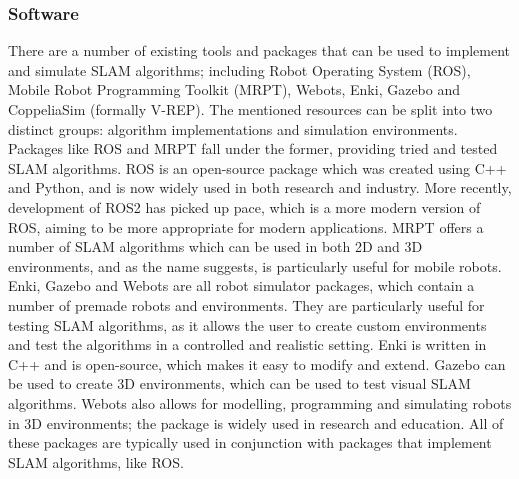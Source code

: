 \documentclass[12pt]{article}
\begin{document}
\subsubsection{Software}
There are a number of existing tools and packages that can be used to implement and simulate SLAM algorithms; including Robot Operating System (ROS),
Mobile Robot Programming Toolkit (MRPT), Webots, Enki, Gazebo and CoppeliaSim (formally V-REP). The mentioned resources can be split into
two distinct groups: algorithm implementations and simulation environments. Packages like ROS and MRPT fall under the former, providing tried
and tested SLAM algorithms. ROS is an open-source package which was created using C++ and Python, and is now widely used in both research
and industry. More recently, development of ROS2 has picked up pace, which is a more modern version of ROS, aiming to be more appropriate
for modern applications. MRPT offers a number of SLAM algorithms which can be used in both 2D and 3D environments, and as the name suggests,
is particularly useful for mobile robots.\\
Enki, Gazebo and Webots are all robot simulator packages, which contain a number of premade robots and environments. They are particularly
useful for testing SLAM algorithms, as it allows the user to create custom environments and test the algorithms in a controlled and realistic
setting. Enki is written in C++ and is open-source, which makes it easy to modify and extend. Gazebo can be used to create 3D environments,
which can be used to test visual SLAM algorithms. Webots also allows for modelling, programming and simulating robots in 3D environments;
the package is widely used in research and education. All of these packages are typically used in conjunction with packages that implement
SLAM algorithms, like ROS.\\
\end{document}
